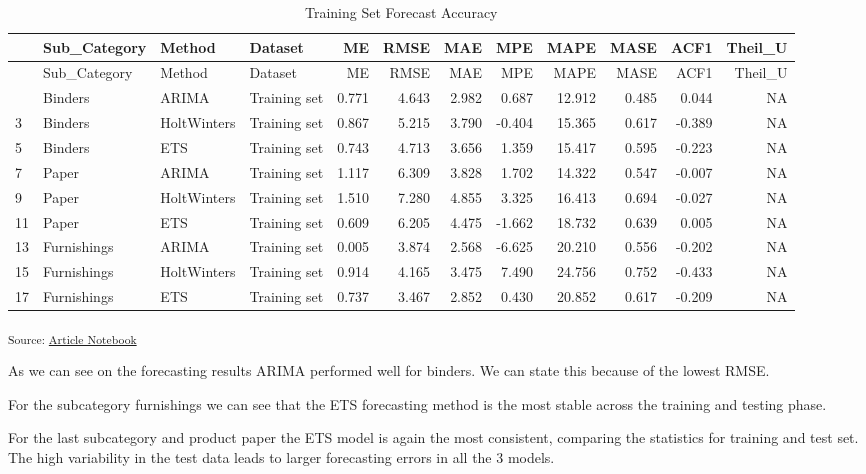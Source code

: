 \documentclass[
  letterpaper,
  DIV=11,
  numbers=noendperiod]{scrartcl}
\begin{document}
\begin{longtable}[]{@{}llllrrrrrrrr@{}}
\caption{Training Set Forecast Accuracy}\tabularnewline
\toprule\noalign{}
& Sub\_Category & Method & Dataset & ME & RMSE & MAE & MPE & MAPE & MASE
& ACF1 & Theil\_U \\
\midrule\noalign{}
\endfirsthead
\toprule\noalign{}
& Sub\_Category & Method & Dataset & ME & RMSE & MAE & MPE & MAPE & MASE
& ACF1 & Theil\_U \\
\midrule\noalign{}
\endhead
\bottomrule\noalign{}
\endlastfoot
1 & Binders & ARIMA & Training set & 0.771 & 4.643 & 2.982 & 0.687 &
12.912 & 0.485 & 0.044 & NA \\
3 & Binders & HoltWinters & Training set & 0.867 & 5.215 & 3.790 &
-0.404 & 15.365 & 0.617 & -0.389 & NA \\
5 & Binders & ETS & Training set & 0.743 & 4.713 & 3.656 & 1.359 &
15.417 & 0.595 & -0.223 & NA \\
7 & Paper & ARIMA & Training set & 1.117 & 6.309 & 3.828 & 1.702 &
14.322 & 0.547 & -0.007 & NA \\
9 & Paper & HoltWinters & Training set & 1.510 & 7.280 & 4.855 & 3.325 &
16.413 & 0.694 & -0.027 & NA \\
11 & Paper & ETS & Training set & 0.609 & 6.205 & 4.475 & -1.662 &
18.732 & 0.639 & 0.005 & NA \\
13 & Furnishings & ARIMA & Training set & 0.005 & 3.874 & 2.568 & -6.625
& 20.210 & 0.556 & -0.202 & NA \\
15 & Furnishings & HoltWinters & Training set & 0.914 & 4.165 & 3.475 &
7.490 & 24.756 & 0.752 & -0.433 & NA \\
17 & Furnishings & ETS & Training set & 0.737 & 3.467 & 2.852 & 0.430 &
20.852 & 0.617 & -0.209 & NA \\
\end{longtable}

\textsubscript{Source:
\href{https://SJbrou.github.io/Supply_Chain_Data_Analysis/index.qmd.html}{Article
Notebook}}

As we can see on the forecasting results ARIMA performed well for
binders. We can state this because of the lowest RMSE.

For the subcategory furnishings we can see that the ETS forecasting
method is the most stable across the training and testing phase.

For the last subcategory and product paper the ETS model is again the
most consistent, comparing the statistics for training and test set. The
high variability in the test data leads to larger forecasting errors in
all the 3 models.
\end{document}
